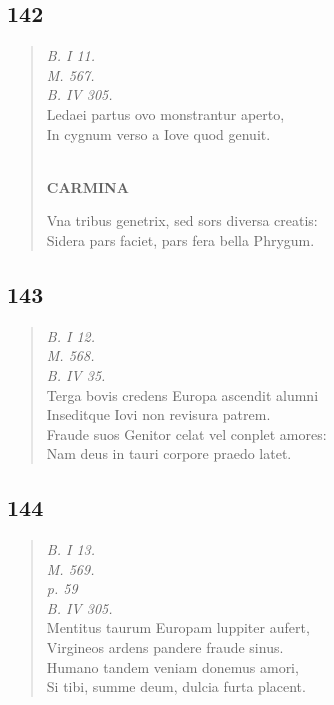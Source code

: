 \documentclass[11pt, a4paper]{report}
\begin{document}
            \subsection*{142}
      \begin{verse}
      \textit{B. I 11.} \\ \textit{M. 567.} \\ \textit{B. IV 305.} \\ Ledaei partus ovo monstrantur aperto, \\ In cygnum verso a Iove quod genuit. \\ 
        ﻿\pagebreak 
     \marginpar{[142]} \begin{center} \textbf{CARMINA} \end{center}Vna tribus genetrix, sed sors diversa creatis: \\ Sidera pars faciet, pars fera bella Phrygum. \\ 
      \end{verse}
  
            \subsection*{143}
      \begin{verse}
      \textit{B. I 12.} \\ \textit{M. 568.} \\ \textit{B. IV 35.} \\ Terga bovis credens Europa ascendit alumni \\ Inseditque Iovi non revisura patrem. \\ Fraude suos Genitor celat vel conplet amores: \\ Nam deus in tauri corpore praedo latet. \\ 
      \end{verse}
  
            \subsection*{144}
      \begin{verse}
      \textit{B. I 13.} \\ \textit{M. 569.} \\ \textit{p. 59} \\ \textit{B. IV 305.} \\ Mentitus taurum Europam luppiter aufert, \\ Virgineos ardens pandere fraude sinus. \\ Humano tandem veniam donemus amori, \\ Si tibi, summe deum, dulcia furta placent. \\ 
      \end{verse}
  
\end{document}
